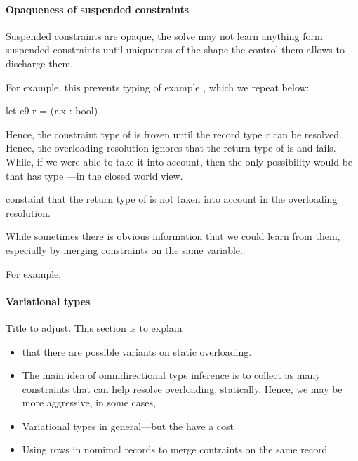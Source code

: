 \documentclass[acmsmall,screen,nonacm,review]{acmart}
\begin{document}

\paragraph {Opaqueness of suspended constraints}

Suspended constraints are opaque, \ie the solve may not learn anything form
suspended constraints until uniqueness of the shape the control them allows
to discharge them.

For example, this prevents typing of example , which we repeat
below:
\begin{program}
let e9 r = (r.x : bool)
\end{program}
Hence, the constraint type of  is frozen until the record type
$r$ can be resolved. Hence, the overloading resolution ignores that the
return type of  is  and fails. While, if we were
able to take it into account, then the only possibility would be that
 has type ---in the closed world view.


constaint that the return type of
 is not taken into account in the overloading resolution.


While sometimes there is obvious information that we could learn from them,
especially by merging constraints on the same variable.

For example,


\paragraph {Variational types}

\begin{version}{\color{blue}\Draft}
Title to adjust.
This section is to explain
\begin{itemize}

\item
  that there are possible variants on static overloading.

\item
  The main idea of omnidirectional type inference is to collect as
  many constraints that can help resolve overloading, statically.
  Hence, we may be more aggressive, in some cases,

\item
  Variational types in general---but the have a cost

\item
  Using rows in nomimal records to merge contraints on the same record.
\end{itemize}


\end{version}
\end{document}
